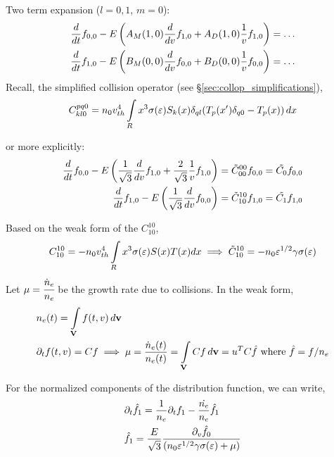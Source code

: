 \documentclass{article}[draft]
\begin{document}
Two term expansion ($l = 0,1$, $m=0$):
\begin{align*}
\frac{d}{dt} f_{0,0} - E 
\left( A_M\of{1,0} \frac{d}{d\vr} f_{1,0} 
+ A_D\of{1,0} \frac{1}{\vr} f_{1,0} \right) &= \ldots
\\
\frac{d}{dt} f_{1,0} - E 
\left( B_M\of{0,0} \frac{d}{d\vr} f_{0,0} 
+ B_D\of{0,0} \frac{1}{\vr} f_{0,0} \right) &= \ldots
\end{align*}
Recall, the simplified collision operator (see \S\ref{sec:collop_simplifications}), 
\begin{align*}
C^{pq0}_{kl0}  = n_0 v_{th}^4 \myint_{R} x^3 \sigma\of{\varepsilon} S_k\of{x} \delta_{ql} \of{T_p\of{x^\prime}\delta_{q0} - T_p\of{x}} \diff{x} 
\end{align*} 

or more explicitly:
\begin{align*}
\frac{d}{dt} f_{0,0} - E 
\left( \frac{1}{\sqrt{3}} \frac{d}{dv} f_{1,0} 
+  \frac{2}{\sqrt{3}} \frac{1}{v} f_{1,0} \right) &= \tilde{C}^{00}_{00} f_{0,0} = \tilde{C_0} f_{0,0}
\\
\frac{d}{dt} f_{1,0} - E 
\left( \frac{1}{\sqrt{3}} \frac{d}{dv} f_{0,0} \right) &=  \tilde{C}^{10}_{10} f_{1,0} = \tilde{C_1} f_{1,0}
\end{align*}

Based on the weak form of the $C^{10}_{10}$, 
\begin{align*}
C^{10}_{10} = -n_0 v_{th}^4 \myint_{R} x^3 \sigma\of{\varepsilon} S(x) T(x) dx \implies  \tilde{C}^{10}_{10} = -n_0 \varepsilon^{1/2} \gamma \sigma\of{\varepsilon} 
\end{align*} Let $\mu = \cfrac{\dot{n}_e}{n_e}$ be the growth rate due to collisions. In the weak form, 
\begin{align*}
&n_e\of{t} =\myint_{\vect{V}} f(t,v) \diff{\vect{v}} \\
&\partial_t f(t,v) = C f \implies \mu = \frac{\dot{n}_e\of{t}}{n_e\of{t}} = \myint_{\vect{V}} C f \diff{\vect{v}} = u^T C \hat{f} \text{ where } \hat{f} = f/n_e
\end{align*}

For the normalized components of the distribution function, we can write, 
\begin{align*}
&\partial_t \hat{f_1} = \frac{1}{n_e} \partial_t f_1 - \frac{\dot{n_e}}{n_e} \hat{f_1} \\
&\hat{f_1} = \frac{E}{\sqrt{3}} \frac{\partial_{v}\hat{f_0}}{(n_0 \varepsilon^{1/2}\gamma \sigma\of{\varepsilon} + \mu)}
\end{align*}
\end{document}

